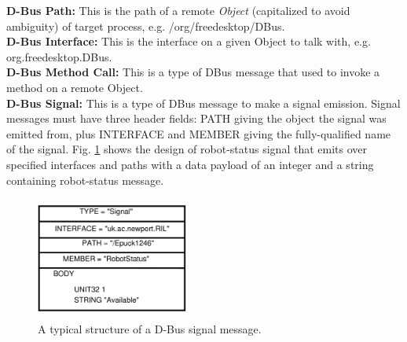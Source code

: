 \documentclass{ifacconf}
\begin{document}
\textbf{D-Bus Path: }
This is the path of a remote \textit{Object} (capitalized to avoid ambiguity) of target process, e.g. /org/freedesktop/DBus.\\
\textbf{D-Bus Interface: }
This is the interface on a given Object to talk with, e.g. org.freedesktop.DBus.\\
\textbf{D-Bus Method Call: }
This is a type of DBus message that used to invoke a method on a remote Object.\\
\textbf{D-Bus Signal: }
This is a type of DBus message to make a signal emission. Signal messages must have three header fields: PATH giving the object the signal was emitted from, plus INTERFACE and MEMBER giving the fully-qualified name of the signal. Fig. \ref{fig:dbus-signal-protocol}  shows the design of robot-status signal that emits over specified interfaces and paths with a data payload of an integer and a string containing robot-status message.\\
\begin{figure}
\begin{center}
\includegraphics[width=5cm,height=4cm]{./dia-files/dbus-signal-protocol} %
\caption{A typical structure of a D-Bus signal message.} 
\label{fig:dbus-signal-protocol}
\end{center}
\end{figure}
\end{document}
